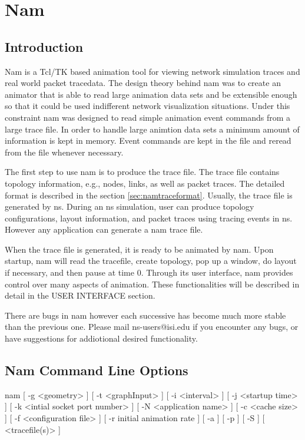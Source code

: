 
\chapter{Nam}
\label{chap:nam}


\section{Introduction}

Nam is a Tcl/TK based animation tool for viewing network simulation traces and real world packet tracedata. The design theory behind nam was to create an animator that is able to read large animation data sets and be extensible enough so that it could be used indifferent network visualization situations.  Under this constraint nam was designed to read simple animation event commands from a large trace file.  In order to handle large animtion data sets a minimum amount of information is kept in memory.  Event commands are kept in the file and reread from the file whenever necessary.

The first step to use nam is to produce the trace file. The trace file contains topology information, e.g., nodes, links, as well as packet traces. The detailed format is described in the section \ref{sec:namtraceformat}. Usually, the trace file is generated by ns. During an ns simulation, user can produce topology configurations, layout information, and packet traces using tracing events in ns.  However any application can generate a nam trace file.

When the trace file is generated, it is ready to be animated by nam. Upon startup, nam will read the tracefile, create topology, pop up a window, do layout if necessary, and then pause at time 0. Through its user interface, nam provides control over many aspects of animation. These functionalities will be described in detail in the USER INTERFACE section.

There are bugs in nam however each successive has become much more stable than the previous one.  Please  mail ns-users@isi.edu if you encounter any bugs, or have suggestions for addiotional desired functionality.

\section{Nam Command Line Options}
\label{sec:namcommandlineoptions}
\begin{program}
nam [ -g <geometry> ] [ -t <graphInput> ] [ -i <interval> ] [ -j <startup time> ] 
    [ -k <intial socket port number> ] [ -N <application name> ] [ -c <cache size> ] 
    [ -f <configuration file> ] [ -r initial animation rate ]
    [ -a ] [ -p ] [ -S ]
    [ <tracefile(s)> ]
\end{program}

